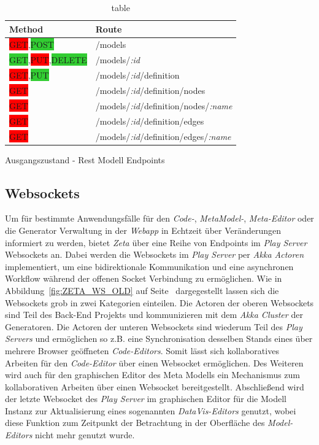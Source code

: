 \begin{table}[ht]
    \smallskip
    \centering
    \begin{tabular}{| l | l |}
    \hline
    \bf Method & \bf Route \\ \hline
    \colorbox{red}{GET},\colorbox{LimeGreen}{POST} & /models \\ \hline
    \colorbox{LimeGreen}{GET},\colorbox{red}{PUT},\colorbox{LimeGreen}{DELETE} & /models/\emph{:id} \\ \hline
    \colorbox{red}{GET},\colorbox{LimeGreen}{PUT} & /models/\emph{:id}/definition \\ \hline
    \colorbox{red}{GET} & /models/\emph{:id}/definition/nodes \\ \hline
    \colorbox{red}{GET} & /models/\emph{:id}/definition/nodes/\emph{:name} \\ \hline
    \colorbox{red}{GET} & /models/\emph{:id}/definition/edges \\ \hline
    \colorbox{red}{GET} & /models/\emph{:id}/definition/edges/\emph{:name} \\ \hline
    \end{tabular}
    \caption{table}{Ausgangszustand - Rest Modell Endpoints}
    \label{tab:ZETA_REST_MODEL_OLD}
\end{table}

\subsection{Websockets}

Um für bestimmte Anwendungsfälle für den \textit{Code-}, \textit{MetaModel-}, \textit{Meta-Editor} oder die Generator Verwaltung in der \textit{Webapp} in Echtzeit über Veränderungen informiert zu werden, bietet \textit{Zeta} über eine Reihe von Endpoints im \textit{Play Server} Websockets an. Dabei werden die Websockets im \textit{Play Server} per \textit{Akka Actoren} implementiert, um eine bidirektionale Kommunikation und eine asynchronen Workflow während der offenen Socket Verbindung zu ermöglichen. Wie in Abbildung~\ref{fig:ZETA_WS_OLD} auf Seite~\pageref{fig:ZETA_WS_OLD} dargegestellt lassen sich die Websockets grob in zwei Kategorien einteilen. Die Actoren der oberen Websockets sind Teil des Back-End Projekts und kommunizieren mit dem \textit{Akka Cluster} der Generatoren. Die Actoren der unteren Websockets sind wiederum Teil des \textit{Play Servers} und ermöglichen so z.B. eine Synchronisation desselben Stands eines über mehrere Browser geöffneten \textit{Code-Editors}. Somit lässt sich kollaboratives Arbeiten für den \textit{Code-Editor} über einen Websocket ermöglichen. Des Weiteren wird auch für den graphischen Editor des Meta Modells ein Mechanismus zum kollaborativen Arbeiten über einen Websocket bereitgestellt. Abschließend wird der letzte Websocket des \textit{Play Server} im graphischen Editor für die Modell Instanz zur Aktualisierung eines sogenannten \textit{DataVis-Editors} genutzt, wobei diese Funktion zum Zeitpunkt der Betrachtung in der Oberfläche des \textit{Model-Editors} nicht mehr genutzt wurde.

